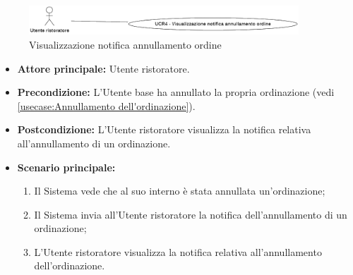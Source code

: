 \label{usecase:Visualizzazione notifica annullamento ordine}

\begin{figure}[h]
	\centering
	\includegraphics[width=0.9\textwidth]{./uml/UCR4.png} 
	\caption{Visualizzazione notifica annullamento ordine}
	\label{fig:UCR4}
  \end{figure}

\begin{itemize}
	\item \textbf{Attore principale:} Utente ristoratore.

	\item \textbf{Precondizione:} L'Utente base ha annullato la propria ordinazione (vedi \autoref{usecase:Annullamento dell'ordinazione}).

	\item \textbf{Postcondizione:} L'Utente ristoratore visualizza la notifica relativa all'annullamento di un ordinazione.

	\item \textbf{Scenario principale:}
	      \begin{enumerate}
		      \item Il Sistema vede che al suo interno è stata annullata un'ordinazione;
		      \item Il Sistema invia all'Utente ristoratore la notifica dell'annullamento di un ordinazione;
		      \item L'Utente ristoratore visualizza la notifica relativa all'annullamento dell'ordinazione.
	      \end{enumerate}
\end{itemize}
